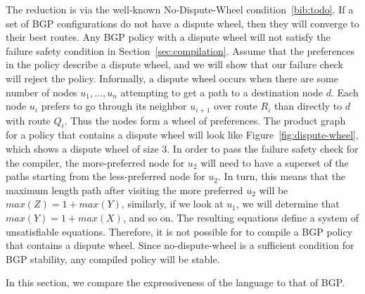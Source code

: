 The reduction is via the well-known No-Dispute-Wheel condition~\ref{bib:todo}. If a set of BGP configurations do not have a dispute wheel, then they will converge to their best routes. Any BGP policy with a dispute wheel will not satisfy the failure safety condition in Section~\ref{sec:compilation}. Assume that the preferences in the policy describe a dispute wheel, and we will show that our failure check will reject the policy. Informally, a dispute wheel occurs when there are some number of nodes $u_1, \dots, u_n$ attempting to get a path to a destination node $d$. Each node $u_i$ prefers to go through its neighbor $u_{i+1}$ over route $R_i$ than directly to $d$ with route $Q_i$. Thus the nodes form a wheel of preferences. The product graph for a policy that contains a dispute wheel will look like Figure~\ref{fig:dispute-wheel}, which shows a dispute wheel of size 3. In order to pass the failure safety check for the compiler, the more-preferred node for $u_2$ will need to have a superset of the paths starting from the less-preferred node for $u_2$. In turn, this means that the maximum length path after visiting the more preferred $u_2$ will be $max(Z) = 1 + max(Y)$, similarly, if we look at $u_1$, we will determine that $max(Y) = 1 + max(X)$, and so on. The resulting equations define a system of unsatisfiable equations. Therefore, it is not possible for \sysname to compile a BGP policy that contains a dispute wheel. Since no-dispute-wheel is a sufficient condition for BGP stability, any compiled \sysname policy will be stable.



In this section, we compare the expressiveness of the \sysname language to that of BGP.


